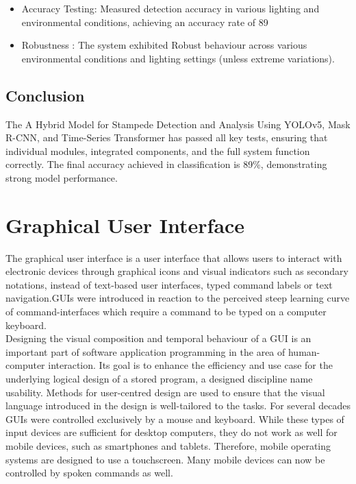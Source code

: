 \documentclass[11pt]{report}
\begin{document}
 \begin{itemize}
     \item Accuracy Testing: Measured detection accuracy in various lighting and environmental conditions, achieving an accuracy rate of 89%
     \item Robustness : The system exhibited Robust behaviour across various environmental conditions and lighting settings (unless extreme variations).
 \end{itemize}

\section{Conclusion}
The A Hybrid Model for Stampede Detection and Analysis Using YOLOv5, Mask R-CNN, and Time-Series Transformer has passed all key tests, ensuring that individual modules, integrated components, and the full system function correctly. The final accuracy achieved in classification is 89\%, demonstrating strong model performance.

\chapter{Graphical User Interface}
The graphical user interface is a user interface that allows users to interact with electronic devices through graphical icons and visual indicators such as secondary notations, instead of text-based user interfaces, typed command labels or text navigation.GUIs were introduced in reaction to the perceived steep learning curve of command-interfaces which require a command to be typed on a computer keyboard. \\

Designing the visual composition and temporal behaviour of a GUI is an important part of software application programming in the area of human-computer interaction. Its goal is to enhance the efficiency and use case for the underlying logical design of a stored program, a designed discipline name usability. Methods for user-centred design are used to ensure that the visual language introduced in the design is well-tailored to the tasks. For several decades GUIs were controlled exclusively by a mouse and keyboard. While these types of input devices are sufficient for desktop computers, they do not work as well for mobile devices, such as smartphones and tablets. Therefore, mobile operating systems are designed to use a touchscreen. Many mobile devices can now be controlled by spoken commands as well. 
\end{document}
